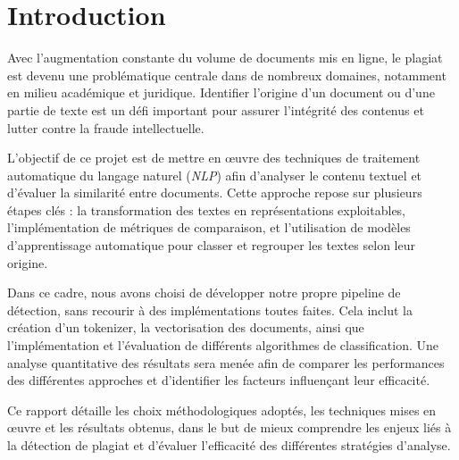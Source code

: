 \newpage
\section{Introduction}

Avec l’augmentation constante du volume de documents mis en ligne, le plagiat est devenu une problématique centrale dans de nombreux domaines, notamment en milieu académique et juridique. Identifier l’origine d’un document ou d’une partie de texte est un défi important pour assurer l’intégrité des contenus et lutter contre la fraude intellectuelle.

L’objectif de ce projet est de mettre en œuvre des techniques de traitement automatique du langage naturel (\textit{NLP}) afin d’analyser le contenu textuel et d’évaluer la similarité entre documents. Cette approche repose sur plusieurs étapes clés : la transformation des textes en représentations exploitables, l’implémentation de métriques de comparaison, et l’utilisation de modèles d’apprentissage automatique pour classer et regrouper les textes selon leur origine.

Dans ce cadre, nous avons choisi de développer notre propre pipeline de détection, sans recourir à des implémentations toutes faites. Cela inclut la création d’un tokenizer, la vectorisation des documents, ainsi que l’implémentation et l’évaluation de différents algorithmes de classification. Une analyse quantitative des résultats sera menée afin de comparer les performances des différentes approches et d’identifier les facteurs influençant leur efficacité.

Ce rapport détaille les choix méthodologiques adoptés, les techniques mises en œuvre et les résultats obtenus, dans le but de mieux comprendre les enjeux liés à la détection de plagiat et d’évaluer l’efficacité des différentes stratégies d’analyse.
